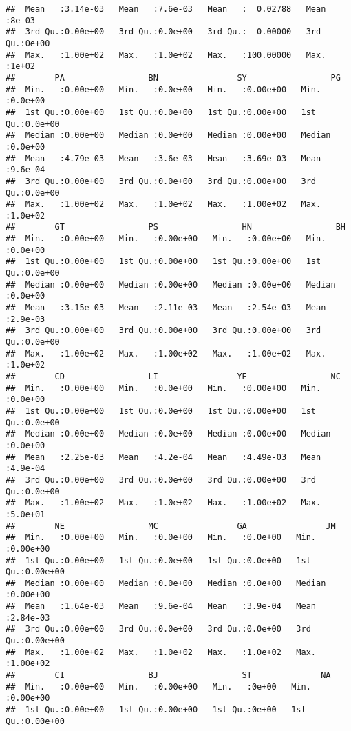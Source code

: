 \documentclass[
]{article}
\begin{document}
\begin{verbatim}
##  Mean   :3.14e-03   Mean   :7.6e-03   Mean   :  0.02788   Mean   :8e-03  
##  3rd Qu.:0.00e+00   3rd Qu.:0.0e+00   3rd Qu.:  0.00000   3rd Qu.:0e+00  
##  Max.   :1.00e+02   Max.   :1.0e+02   Max.   :100.00000   Max.   :1e+02  
##        PA                 BN                SY                 PG         
##  Min.   :0.00e+00   Min.   :0.0e+00   Min.   :0.00e+00   Min.   :0.0e+00  
##  1st Qu.:0.00e+00   1st Qu.:0.0e+00   1st Qu.:0.00e+00   1st Qu.:0.0e+00  
##  Median :0.00e+00   Median :0.0e+00   Median :0.00e+00   Median :0.0e+00  
##  Mean   :4.79e-03   Mean   :3.6e-03   Mean   :3.69e-03   Mean   :9.6e-04  
##  3rd Qu.:0.00e+00   3rd Qu.:0.0e+00   3rd Qu.:0.00e+00   3rd Qu.:0.0e+00  
##  Max.   :1.00e+02   Max.   :1.0e+02   Max.   :1.00e+02   Max.   :1.0e+02  
##        GT                 PS                 HN                 BH         
##  Min.   :0.00e+00   Min.   :0.00e+00   Min.   :0.00e+00   Min.   :0.0e+00  
##  1st Qu.:0.00e+00   1st Qu.:0.00e+00   1st Qu.:0.00e+00   1st Qu.:0.0e+00  
##  Median :0.00e+00   Median :0.00e+00   Median :0.00e+00   Median :0.0e+00  
##  Mean   :3.15e-03   Mean   :2.11e-03   Mean   :2.54e-03   Mean   :2.9e-03  
##  3rd Qu.:0.00e+00   3rd Qu.:0.00e+00   3rd Qu.:0.00e+00   3rd Qu.:0.0e+00  
##  Max.   :1.00e+02   Max.   :1.00e+02   Max.   :1.00e+02   Max.   :1.0e+02  
##        CD                 LI                YE                 NC         
##  Min.   :0.00e+00   Min.   :0.0e+00   Min.   :0.00e+00   Min.   :0.0e+00  
##  1st Qu.:0.00e+00   1st Qu.:0.0e+00   1st Qu.:0.00e+00   1st Qu.:0.0e+00  
##  Median :0.00e+00   Median :0.0e+00   Median :0.00e+00   Median :0.0e+00  
##  Mean   :2.25e-03   Mean   :4.2e-04   Mean   :4.49e-03   Mean   :4.9e-04  
##  3rd Qu.:0.00e+00   3rd Qu.:0.0e+00   3rd Qu.:0.00e+00   3rd Qu.:0.0e+00  
##  Max.   :1.00e+02   Max.   :1.0e+02   Max.   :1.00e+02   Max.   :5.0e+01  
##        NE                 MC                GA                JM          
##  Min.   :0.00e+00   Min.   :0.0e+00   Min.   :0.0e+00   Min.   :0.00e+00  
##  1st Qu.:0.00e+00   1st Qu.:0.0e+00   1st Qu.:0.0e+00   1st Qu.:0.00e+00  
##  Median :0.00e+00   Median :0.0e+00   Median :0.0e+00   Median :0.00e+00  
##  Mean   :1.64e-03   Mean   :9.6e-04   Mean   :3.9e-04   Mean   :2.84e-03  
##  3rd Qu.:0.00e+00   3rd Qu.:0.0e+00   3rd Qu.:0.0e+00   3rd Qu.:0.00e+00  
##  Max.   :1.00e+02   Max.   :1.0e+02   Max.   :1.0e+02   Max.   :1.00e+02  
##        CI                 BJ                 ST              NA          
##  Min.   :0.00e+00   Min.   :0.00e+00   Min.   :0e+00   Min.   :0.00e+00  
##  1st Qu.:0.00e+00   1st Qu.:0.00e+00   1st Qu.:0e+00   1st Qu.:0.00e+00  

\end{verbatim}
\end{document}
